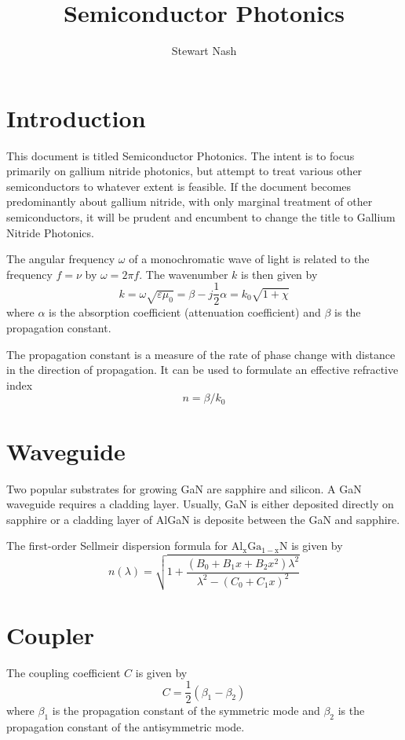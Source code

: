 \documentclass{book}
\begin{document}
	\title{Semiconductor Photonics}
	\author{Stewart Nash}
	
	\maketitle
	
	\chapter{Introduction}
	
		{\color{Red} This document is titled Semiconductor Photonics. The intent is to focus primarily on gallium nitride photonics, but attempt to treat various other semiconductors to whatever extent is feasible. If the document becomes predominantly about gallium nitride, with only marginal treatment of other semiconductors, it will be prudent and encumbent to change the title to Gallium Nitride Photonics.}
		
		The angular frequency $\omega$ of a monochromatic wave of light is related to the frequency $f=\nu$ by $\omega=2\pi f$. The wavenumber $k$ is then given by
		\begin{equation}
			k=\omega\sqrt{\varepsilon\mu_0}=\beta-j\frac{1}{2}\alpha=k_0\sqrt{1+\chi}
		\end{equation}
		where $\alpha$ is the absorption coefficient (attenuation coefficient) and $\beta$ is the propagation constant.
		
		The propagation constant is a measure of the rate of phase change with distance in the direction of propagation. It can be used to formulate an effective refractive index
		\begin{equation}
			n=\beta/k_0
		\end{equation}

	\chapter{Waveguide}
	
			Two popular substrates for growing GaN are sapphire and silicon. A GaN waveguide requires a cladding layer. Usually, GaN is either deposited directly on sapphire or a cladding layer of AlGaN is deposite between the GaN and sapphire.
			
			The first-order Sellmeir dispersion formula for $\mathrm{Al_xGa_{1-x}N}$ is given by
			\begin{equation}
				n(\lambda)=\sqrt{1+\frac{(B_0+B_1x+B_2x^2)\lambda^2}{\lambda^2-(C_0+C_1x)^2}}
			\end{equation}

	\chapter{Coupler}
		
		The coupling coefficient $C$ is given by
		\begin{equation}
			C=\frac{1}{2}(\beta_1-\beta_2)
		\end{equation}
		where $\beta_1$ is the propagation constant of the symmetric mode and $\beta_2$ is the propagation constant of the antisymmetric mode.
\end{document}
